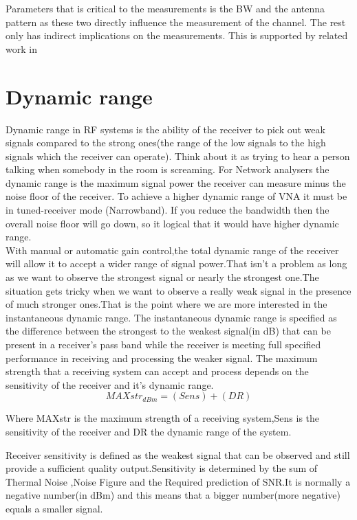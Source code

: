 Parameters that is critical to the measurements is the BW and the antenna pattern as these two directly influence the measurement of the channel. The rest only has indirect implications on the measurements. This is supported by related work in \citep{MeasurementComplexRay}



\section{Dynamic range}
Dynamic range in RF systems is the ability of the receiver to pick out weak signals compared to the strong ones(the range of the low signals to the high signals which the receiver can operate). Think about it as trying to hear a person talking when somebody in the room is screaming. For Network analysers the dynamic range is the maximum signal power the receiver can measure minus the noise floor of the receiver. To achieve a higher dynamic range of \gls{VNA} it must be  in tuned-receiver mode (Narrowband). If you reduce the bandwidth then the overall noise floor will go down, so it logical that it would have higher dynamic range. \citep{AgilentNVA} \\
With manual or automatic gain control,the total dynamic range of the receiver will allow it to accept a wider range of signal power.That isn't a problem as long as we want to observe the strongest signal or nearly the strongest one.The situation gets tricky when we want to observe a really weak signal in the presence of much stronger ones.That is the point where we are more interested in the instantaneous dynamic range.
The instantaneous dynamic range is specified as the difference between the strongest to the weakest signal(in dB) that can be present in a receiver's pass band while the receiver is meeting full specified performance in receiving and processing the weaker signal.
The maximum strength that a receiving system can accept and process depends on the sensitivity of the receiver and it's dynamic range.
\begin{equation}
MAXstr_{dBm} = (Sens) +(DR)
\label{Max strength of a receiving system}
\end{equation}

Where MAXstr is the maximum strength of a receiving system,Sens is the sensitivity of the receiver and DR the dynamic range of the system.\citep{DyR}

Receiver sensitivity is defined as the weakest signal that can be observed and still provide a sufficient quality output.Sensitivity is determined by the sum of Thermal Noise ,Noise Figure and the Required prediction of SNR.It is normally a negative number(in dBm) and this means that a bigger number(more negative) equals a smaller signal.



